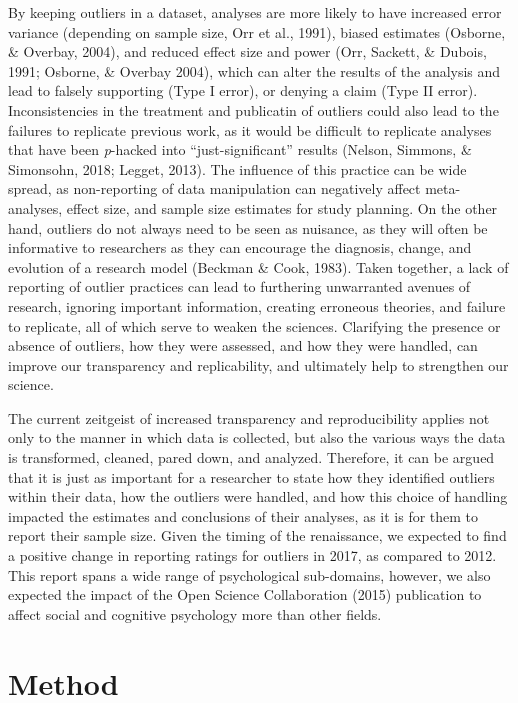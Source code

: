 \documentclass[english,man]{apa6}
\theoremstyle{definition}
\theoremstyle{definition}
\theoremstyle{definition}
\theoremstyle{remark}
\begin{document}
By keeping outliers in a dataset, analyses are more likely to have
increased error variance (depending on sample size, Orr et al., 1991),
biased estimates (Osborne, \& Overbay, 2004), and reduced effect size
and power (Orr, Sackett, \& Dubois, 1991; Osborne, \& Overbay 2004),
which can alter the results of the analysis and lead to falsely
supporting (Type I error), or denying a claim (Type II error).
Inconsistencies in the treatment and publicatin of outliers could also
lead to the failures to replicate previous work, as it would be
difficult to replicate analyses that have been \emph{p}-hacked into
\enquote{just-significant} results (Nelson, Simmons, \& Simonsohn, 2018;
Legget, 2013). The influence of this practice can be wide spread, as
non-reporting of data manipulation can negatively affect meta-analyses,
effect size, and sample size estimates for study planning. On the other
hand, outliers do not always need to be seen as nuisance, as they will
often be informative to researchers as they can encourage the diagnosis,
change, and evolution of a research model (Beckman \& Cook, 1983). Taken
together, a lack of reporting of outlier practices can lead to
furthering unwarranted avenues of research, ignoring important
information, creating erroneous theories, and failure to replicate, all
of which serve to weaken the sciences. Clarifying the presence or
absence of outliers, how they were assessed, and how they were handled,
can improve our transparency and replicability, and ultimately help to
strengthen our science.

The current zeitgeist of increased transparency and reproducibility
applies not only to the manner in which data is collected, but also the
various ways the data is transformed, cleaned, pared down, and analyzed.
Therefore, it can be argued that it is just as important for a
researcher to state how they identified outliers within their data, how
the outliers were handled, and how this choice of handling impacted the
estimates and conclusions of their analyses, as it is for them to report
their sample size. Given the timing of the renaissance, we expected to
find a positive change in reporting ratings for outliers in 2017, as
compared to 2012. This report spans a wide range of psychological
sub-domains, however, we also expected the impact of the Open Science
Collaboration (2015) publication to affect social and cognitive
psychology more than other fields.

\section{Method}\label{method}
\end{document}
